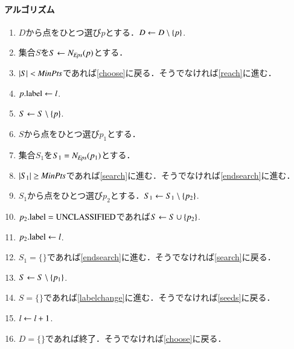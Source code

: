 \paragraph{アルゴリズム}
\begin{enumerate}

\item \label{choose}
$D$から点をひとつ選び$p$とする．$D \leftarrow D \setminus \{p\}$.

\item
集合$S$を$S \leftarrow N_{\it Eps}(p)$とする．

\item
$|S| < {\it MinPts}$であれば\ref{choose}に戻る．そうでなければ\ref{reach}に進む．

\item \label{reach}
$p.{\rm label} \leftarrow l$.

\item
$S \leftarrow S \setminus \{p\}$.

\item \label{seeds}
$S$から点をひとつ選び$p_1$とする．

\item
集合$S_1$を$S_1 = N_{\it Eps}(p_1)$とする．

\item
$|S_1| \geq {\it MinPts}$であれば\ref{search}に進む．そうでなければ\ref{endsearch}に進む．

\item \label{search}
$S_1$から点をひとつ選び$p_2$とする．$S_1 \leftarrow S_1 \setminus \{p_2\}$.

\item
$p_2.{\rm label} = {\rm UNCLASSIFIED}$であれば$S \leftarrow S \cup \{p_2\}$.

\item
$p_2.{\rm label} \leftarrow l$.

\item
$S_1 = \{\}$であれば\ref{endsearch}に進む．そうでなければ\ref{search}に戻る．

\item \label{endsearch}
$S \leftarrow S \setminus \{p_1\}$.

\item
$S = \{\}$であれば\ref{labelchange}に進む．そうでなければ\ref{seeds}に戻る．

\item \label{labelchange}
$l \leftarrow l + 1$.

\item
$D = \{\}$であれば終了．そうでなければ\ref{choose}に戻る．

\end{enumerate}

